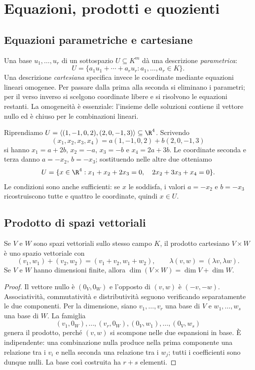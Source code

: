 \chapter{Equazioni, prodotti e quozienti}

\section{Equazioni parametriche e cartesiane}
Una base $u_1,\ldots,u_r$ di un sottospazio $U\subseteq K^m$ dà una
descrizione \emph{parametrica}:
\[
U=\{a_1u_1+\cdots+a_ru_r:a_1,\ldots,a_r\in K\}.
\]
Una descrizione \emph{cartesiana} specifica invece le coordinate
mediante equazioni lineari omogenee. Per passare dalla prima alla
seconda si eliminano i parametri; per il verso inverso si scelgono
coordinate libere e si risolvono le equazioni restanti. La
omogeneità è essenziale: l'insieme delle soluzioni contiene il
vettore nullo ed è chiuso per le combinazioni lineari.

\begin{esercizio}
Riprendiamo
$U=\langle(1,-1,0,2),(2,0,-1,3)\rangle\subseteq\R^4$.
Scrivendo
\[
(x_1,x_2,x_3,x_4)
=a(1,-1,0,2)+b(2,0,-1,3)
\]
si hanno $x_1=a+2b$, $x_2=-a$, $x_3=-b$ e $x_4=2a+3b$.
Le coordinate seconda e terza danno $a=-x_2$, $b=-x_3$; sostituendo
nelle altre due otteniamo
\[
U=\{x\in\R^4:x_1+x_2+2x_3=0,\quad
2x_2+3x_3+x_4=0\}.
\]
Le condizioni sono anche sufficienti: se $x$ le soddisfa, i valori
$a=-x_2$ e $b=-x_3$ ricostruiscono tutte e quattro le coordinate,
quindi $x\in U$.
\end{esercizio}

\section{Prodotto di spazi vettoriali}
\begin{proposizione}
Se $V$ e $W$ sono spazi vettoriali sullo stesso campo $K$, il prodotto
cartesiano $V\times W$ è uno spazio vettoriale con
\[
(v_1,w_1)+(v_2,w_2)=(v_1+v_2,w_1+w_2),\qquad
\lambda(v,w)=(\lambda v,\lambda w).
\]
Se $V$ e $W$ hanno dimensioni finite, allora
$\dim(V\times W)=\dim V+\dim W$.
\end{proposizione}
\begin{proof}
Il vettore nullo è $(0_V,0_W)$ e l'opposto di $(v,w)$ è
$(-v,-w)$. Associatività, commutatività e distributività seguono
verificando separatamente le due componenti. Per la dimensione,
siano $v_1,\ldots,v_r$ una base di $V$ e $w_1,\ldots,w_s$ una base
di $W$. La famiglia
\[
(v_1,0_W),\ldots,(v_r,0_W),
(0_V,w_1),\ldots,(0_V,w_s)
\]
genera il prodotto, perché $(v,w)$ si scompone nelle due espansioni
in base. È indipendente: una combinazione nulla produce nella prima
componente una relazione tra i $v_i$ e nella seconda una relazione
tra i $w_j$; tutti i coefficienti sono dunque nulli. La base così
costruita ha $r+s$ elementi.
\end{proof}

